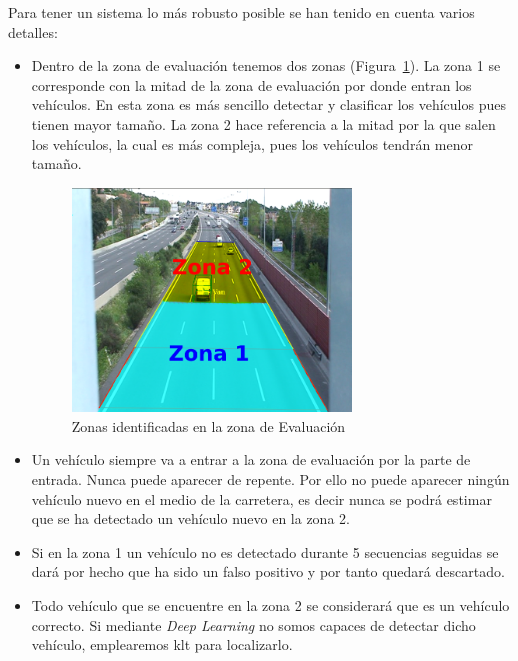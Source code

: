 Para tener un sistema lo más robusto posible se han tenido en cuenta varios detalles:

\begin{itemize}
    \item Dentro de la zona de evaluación tenemos dos zonas (Figura~\ref{fig.zona_evaluacion}). La zona 1 se corresponde con la mitad de la zona de evaluación por donde entran los vehículos. En esta zona es más sencillo detectar y clasificar los vehículos pues tienen mayor tamaño. La zona 2 hace referencia a la mitad por la que salen los vehículos, la cual es más compleja, pues los vehículos tendrán menor tamaño.
    \begin{figure}[H] 
\begin{center}
	\includegraphics[width=0.7\textwidth]{figures/Diseno_global/zonas_evaluacion.png}
   \caption{Zonas identificadas en la zona de Evaluación}
	\label{fig.zona_evaluacion}
\end{center}

\end{figure}
    
    \item Un vehículo siempre va a entrar a la zona de evaluación por la parte de entrada. Nunca puede aparecer de repente. Por ello no puede aparecer ningún vehículo nuevo en el medio de la carretera, es decir nunca se podrá estimar que se ha detectado un vehículo nuevo en la zona 2.
    \item Si en la zona 1 un vehículo no es detectado durante 5 secuencias seguidas se dará por hecho que ha sido un falso positivo y por tanto quedará descartado.
    \item Todo vehículo que se encuentre en la zona 2 se considerará que es un vehículo correcto. Si mediante \textit{Deep Learning} no somos capaces de detectar dicho vehículo, emplearemos \acrshort{klt} para localizarlo. 
\end{itemize}

